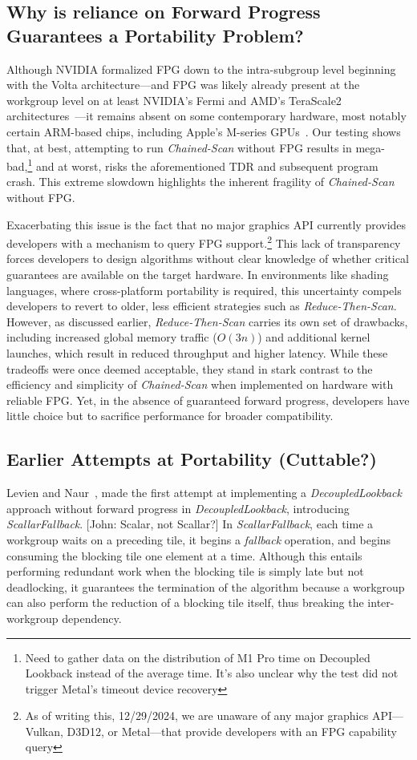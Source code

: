\documentclass[sigconf]{acmart}
\newcommand{\john}[1]{{\footnotesize\color{cyan}[John: #1]}}
\begin{document}
\subsection{Why is reliance on Forward Progress Guarantees a Portability Problem?}
Although NVIDIA formalized FPG down to the intra-subgroup level beginning with the Volta architecture---and FPG was likely already present at the workgroup level on at least NVIDIA's Fermi and AMD's TeraScale2 architectures~\cite{}---it remains absent on some contemporary hardware, most notably certain ARM-based chips, including Apple's M-series GPUs~\cite{10.1145/3485508}. Our testing shows that, at best, attempting to run \emph{Chained-Scan} without FPG results in mega-bad,\footnote{Need to gather data on the distribution of M1 Pro time on Decoupled Lookback instead of the average time. It's also unclear why the test did not trigger Metal's timeout device recovery} and at worst, risks the aforementioned TDR and subsequent program crash. This extreme slowdown highlights the inherent fragility of \emph{Chained-Scan} without FPG\@.

Exacerbating this issue is the fact that no major graphics API currently provides developers with a mechanism to query FPG support.\footnote{As of writing this, 12/29/2024, we are unaware of any major graphics API---Vulkan, D3D12, or Metal---that provide developers with an FPG capability query} This lack of transparency forces developers to design algorithms without clear knowledge of whether critical guarantees are available on the target hardware. In environments like shading languages, where cross-platform portability is required, this uncertainty compels developers to revert to older, less efficient strategies such as \emph{Reduce-Then-Scan}. However, as discussed earlier, \emph{Reduce-Then-Scan} carries its own set of drawbacks, including increased global memory traffic ($O(3n)$) and additional kernel launches, which result in reduced throughput and higher latency. While these tradeoffs were once deemed acceptable, they stand in stark contrast to the efficiency and simplicity of \emph{Chained-Scan} when implemented on hardware with reliable FPG\@. Yet, in the absence of guaranteed forward progress, developers have little choice but to sacrifice performance for broader compatibility.

\subsection{Earlier Attempts at Portability (Cuttable?)}
Levien and Naur~\cite{}, made the first attempt at implementing a \emph{DecoupledLookback} approach without forward progress in \emph{DecoupledLookback}, introducing \emph{ScallarFallback}. \john{Scalar, not Scallar?} In \emph{ScallarFallback}, each time a workgroup waits on a preceding tile, it begins a \emph{fallback} operation, and begins consuming the blocking tile one element at a time. Although this entails performing redundant work when the blocking tile is simply late but not deadlocking, it guarantees the termination of the algorithm because a workgroup can also perform the reduction of a blocking tile itself, thus breaking the inter-workgroup dependency.
\end{document}
